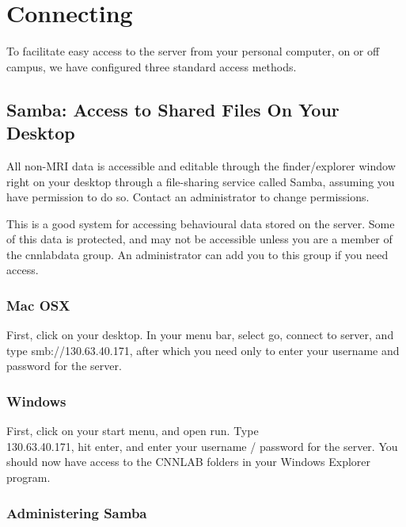 \documentclass[final,titlepage,letterpaper,oneside,12pt]{article}
\renewcommand{\texttt}[2][BrickRed]{\textcolor{#1}{\ttfamily #2}}%
\begin{document}
\section{Connecting}

To facilitate easy access to the server from your personal computer, on or off campus, we have configured three standard access methods.

\subsection{Samba: Access to Shared Files On Your Desktop}

All non-MRI data is accessible and editable through the finder/explorer window right on your desktop through a file-sharing service called Samba, assuming you have permission to do so. Contact an administrator to change permissions.

This is a good system for accessing behavioural data stored on the server. Some of this data is protected, and may not be accessible unless you are a member of the \texttt{cnnlabdata} group. An administrator can add you to this group if you need access.

\subsubsection{Mac OSX}

First, click on your desktop. In your menu bar, select \texttt{go}, \texttt{connect to server}, and type \texttt{smb://130.63.40.171}, after which you need only to enter your username and password for the server.

\subsubsection{Windows}

First, click on your start menu, and open \texttt{run}. Type \texttt{\\130.63.40.171}, hit enter, and enter your username / password for the server. You should now have access to the CNNLAB folders in your Windows Explorer program.
 
\subsubsection{Administering Samba}
\end{document}
